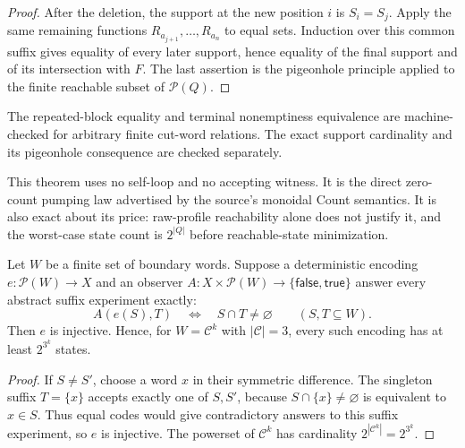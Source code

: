 \begin{proof}
After the deletion, the support at the new position $i$ is $S_i=S_j$.
Apply the same remaining functions
$R_{a_{j+1}},\ldots,R_{a_n}$ to equal sets.  Induction over this common
suffix gives equality of every later support, hence equality of the final
support and of its intersection with $F$.  The last assertion is the
pigeonhole principle applied to the finite reachable subset of
$\mathcal P(Q)$.
\end{proof}

The repeated-block equality and terminal nonemptiness equivalence are
machine-checked for arbitrary finite cut-word relations.
The exact support cardinality and its pigeonhole consequence are checked
separately.

This theorem uses no self-loop and no accepting witness.  It is the direct
zero-count pumping law advertised by the source's monoidal Count semantics.
It is also exact about its price: raw-profile reachability alone does not
justify it, and the worst-case state count is $2^{|Q|}$ before reachable-state
minimization.

\begin{theorem}
\label{thm:unrestricted-support-nerode-separation}
Let $W$ be a finite set of boundary words.  Suppose a deterministic encoding
$e\colon\mathcal P(W)\to X$ and an observer $A\colon X\times\mathcal P(W)\to
\{\mathsf{false},\mathsf{true}\}$ answer every abstract suffix experiment
exactly:
\[
 A(e(S),T)\quad\Longleftrightarrow\quad S\cap T\ne\varnothing
 \qquad(S,T\subseteq W).
\]
Then $e$ is injective.  Hence, for $W=\mathcal C^k$ with
$|\mathcal C|=3$, every such encoding has at least
$2^{3^k}$ states.
\end{theorem}

\begin{proof}
If $S\ne S'$, choose a word $x$ in their symmetric difference.  The singleton
suffix $T=\{x\}$ accepts exactly one of $S,S'$, because
$S\cap\{x\}\ne\varnothing$ is equivalent to $x\in S$.  Thus equal codes
would give contradictory answers to this suffix experiment, so $e$ is
injective.  The powerset of $\mathcal C^k$ has cardinality
$2^{|\mathcal C^k|}=2^{3^k}$.
\end{proof}

